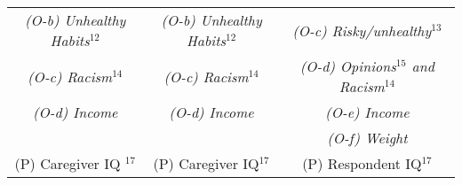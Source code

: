 \begin{table}
\begin{center}
\begin{tabular}{ c c c }
\textit{(O-b) Unhealthy Habits$^{12}$} & \textit{(O-b) Unhealthy Habits$^{12}$} & \textit{(O-c) Risky/unhealthy$^{13}$} \\
\textit{(O-c) Racism$^{14}$} & \textit{(O-c) Racism$^{14}$} & \textit{(O-d) Opinions$^{15}$ and Racism$^{14}$} \\
\textit{(O-d) Income} & \textit{(O-d) Income} & \textit{(O-e) Income} \\
 &  & \textit{(O-f) Weight} \\
(P) Caregiver IQ $^{17}$ & (P) Caregiver IQ$^{17}$ & (P) Respondent IQ$^{17}$ \\
\hline
 \end{tabular}
 \end{center}

\end{table}
